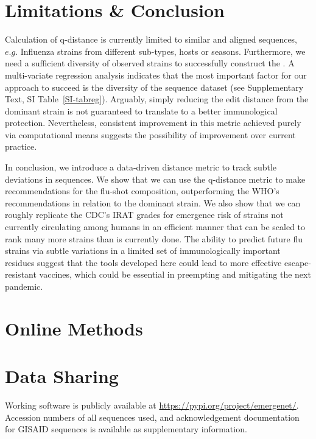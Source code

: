 \documentclass[onecolumn, compsoc,10pt]{IEEEtran}
\begin{document}
\section*{Limitations \& Conclusion}

Calculation of q-distance  is currently limited to similar and aligned sequences, $e.g.$  Influenza strains from different sub-types, hosts or seasons. Furthermore, we need a sufficient diversity of observed strains to successfully construct the \qnet. A multi-variate regression analysis indicates  that the most important factor for our approach to succeed is  the diversity of the sequence dataset (see Supplementary Text, SI Table~\ref{SI-tabreg}). Arguably, simply reducing the edit distance from the dominant strain is not guaranteed to translate to a better immunological protection. Nevertheless, consistent improvement in this metric achieved purely via computational means suggests the possibility of improvement over current practice. 

In conclusion, we introduce a data-driven distance metric to track subtle deviations in sequences. We show that we can use the q-distance metric to make recommendations for the flu-shot composition, outperforming the WHO's recommendations in relation to the dominant strain. We also show that we can roughly replicate the CDC's IRAT grades for emergence risk of strains not currently circulating among humans in an efficient manner that can be scaled to rank many more strains than is currently done. The ability to predict future flu strains via subtle variations in a limited set of immunologically important residues suggest that the tools developed here could lead to more effective escape-resistant vaccines, which could be essential in preempting and mitigating the next pandemic.



\section*{Online Methods}








\section*{Data Sharing} 

Working software is publicly available at \href{https://pypi.org/project/quasinet/}{https://pypi.org/project/emergenet/}.
Accession numbers of all sequences used, and acknowledgement documentation for GISAID sequences is available as supplementary information.
\end{document}

